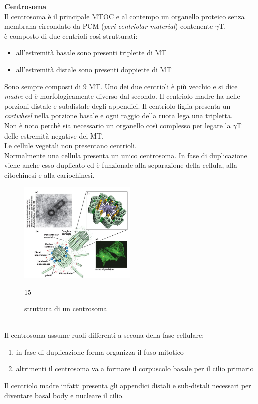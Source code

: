                 \textbf{Centrosoma}\\
                Il centrosoma è il principale MTOC e al contempo un organello proteico senza membrana circondato da PCM (\textit{peri centriolar material}) contenente $\gamma$T.\\
                è composto di due centrioli così strutturati:
                \begin{itemize}
                    \item all'estremità basale sono presenti triplette di MT
                    \item all'estremità distale sono presenti doppiette di MT
                \end{itemize}
                Sono sempre composti di 9 MT. Uno dei due centrioli è più vecchio e si dice \textit{madre} ed è morfologicamente diverso dal secondo. Il centriolo madre ha nelle porzioni distale e subdistale degli appendici. Il centriolo figlia presenta un \textit{cartwheel} nella porzione basale e ogni raggio della ruota lega una tripletta.\\
                Non è noto perchè sia necessario un organello così complesso per legare la $\gamma$T delle estremità negative dei MT.\\
                Le cellule vegetali non presentano centrioli.\\
                Normalmente una cellula presenta un unico centrosoma. In fase di duplicazione viene anche esso duplicato ed è funzionale alla separazione della cellula, alla citochinesi e alla cariochinesi.
                \begin{figure}[h]
                    \centering
                    \includegraphics[width=0.5\textwidth]{images/centrosoma.JPG}
                    \caption{\small struttura di un centrosoma} 
15

                    \label{fig:mesh1}
                \end{figure}\\
                Il centrosoma assume ruoli differenti a secona della fase cellulare:
                \begin{enumerate}
                    \item in fase di duplicazione forma organizza il fuso mitotico
                    \item altrimenti il centrosoma va a formare il corpuscolo basale per il cilio primario
                \end{enumerate}
                Il centriolo madre infatti presenta gli appendici distali e sub-distali necessari per diventare basal body e nucleare il cilio.
        
